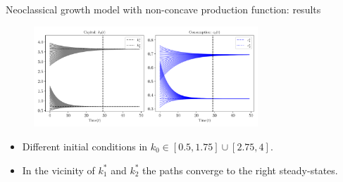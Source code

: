 \documentclass[aspectratio=169,10pt]{beamer}
\begin{document}
\begin{frame}{Neoclassical growth model with non-concave production function: results}
	\begin{figure}[t!]
		\centering
		\includegraphics[width=0.75\textwidth]{figs/growth_sequential_multiple_steady_states_var_initial_k_0.pdf}
	\end{figure}
	\begin{itemize}
		\item Different initial conditions in $k_0 \in [0.5,1.75]\cup[2.75,4]$.
		\smallskip
		\item In the vicinity of $k_1^*$ and $k_2^*$ the paths converge to the right steady-states.
	\end{itemize}
\end{frame}
\end{document}
